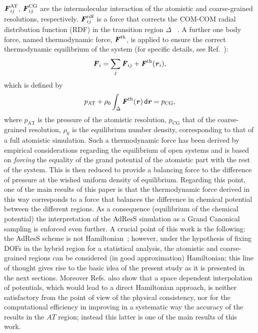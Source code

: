\documentclass[aip,jcp,a4paper,reprint,onecolumn]{revtex4-1}
\newcommand{\vect}[1]{\textbf{\textit{#1}}}
\newcommand{\dd}[1]{\textsf{#1}}
\newcommand{\AT}{{\textrm{{AT}}}}
\newcommand{\CG}{{\textrm{CG}}}
\newcommand{\rdf}{{\textrm{rdf}}}
\begin{document}
$ \vect F^{\AT}_{ij}$, $ \vect F^{\CG}_{ij}$
are the intermolecular interaction of the atomistic and coarse-grained
resolutions, respectively.
$\vect F_{ij}^{\rdf}$ is a force that corrects the COM-COM radial distribution function (RDF) in the transition region $\Delta$ ~\cite{rdfcorr}. A further one body force, named thermodynamic force, ${\vect F}^{\textrm{th}}$, is applied to ensure the correct thermodynamic equilibrium of the system (for specific details, see Ref.~):
\begin{equation}
  {\vect F}_{i}=
  \sum_{j}{\vect F}_{ij}+
  {\vect F}^{\textrm{th}}(\vect r_i),
\label{mody}
\end{equation}
which is defined by
\begin{equation}
  p_{\AT}+
  \rho_0
  \int_{\Delta} {\vect F}^\text{th}(\vect r)\,\dd d\vect r
  =p_{\CG},
  \label{thf}
\end{equation}
where $p_{\AT}$ is the pressure of the atomistic resolution, $p_{\CG}$ that of the coarse-grained resolution, $\rho_{0}$ is the equilibrium number density, corresponding to that of a full atomistic simulation.
Such a thermodynamic force has been derived by empirical considerations regarding the equilibrium of open systems and is based on {\it forcing} the equality of the grand potential of the atomistic part with the rest of the system.
This is then reduced to provide a balancing force to the difference of pressure at the wished uniform density of equilibrium. Regarding this point, one of the main results of this paper is that the thermodynamic force derived in this way corresponds to a force that balances the difference in chemical potential between the different regions. As a consequence (equilibrium of the chemical potential) the interpretation of the AdResS simulation as a Grand Canonical sampling is enforced even further.
 A crucial point of this work is the following: the 
AdResS scheme is not Hamiltonian~\cite{presolo,prlcomm}; however, under the hypothesis of fixing DOFs in the hybrid region for a statistical analysis, the atomistic and
coarse-grained regions can be considered (in good approximation) Hamiltonian; this line of thought gives rise to the basic
idea of the present study as it is presented in the next sections. Moreover Refs.\cite{presolo,prlcomm} also show that a space dependent interpolation of potentials, which would lead to a direct Hamiltonian approach, is neither satisfactory from the point of view of the physical consistency, nor for the computational efficiency in improving in a systematic way the accuracy of the results in the $AT$ region; instead this latter is one of the main results of this work.
\end{document}
